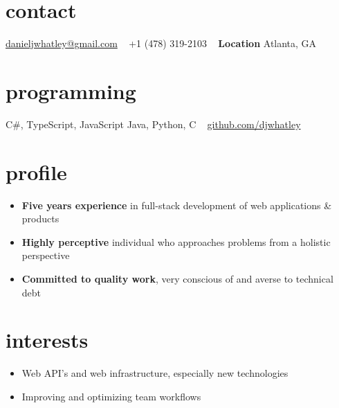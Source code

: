 \documentclass[print]{friggeri-cv} %
\begin{document}


\begin{aside} %
\section{contact}
\href{mailto:danieljwhatley@gmail.com}{danieljwhatley@gmail.com}
~
+1 (478) 319-2103
~
\textbf{Location}
Atlanta, GA
\section{programming}
C\#, TypeScript, JavaScript
Java, Python, C
~
{\FA \faGithub} \href{https://www.github.com/djwhatley}{github.com/djwhatley}
\end{aside}


\section{profile}

\begin{itemize}
	\item \textbf{Five years experience} in full-stack development of web applications \& products
	\item \textbf{Highly perceptive} individual who approaches problems from a holistic perspective
	\item \textbf{Committed to quality work}, very conscious of and averse to technical debt
\end{itemize}



\section{interests}

\begin{itemize}
\item Web API's and web infrastructure, especially new technologies 
\item Improving and optimizing team workflows
\end{itemize}
\end{document}
